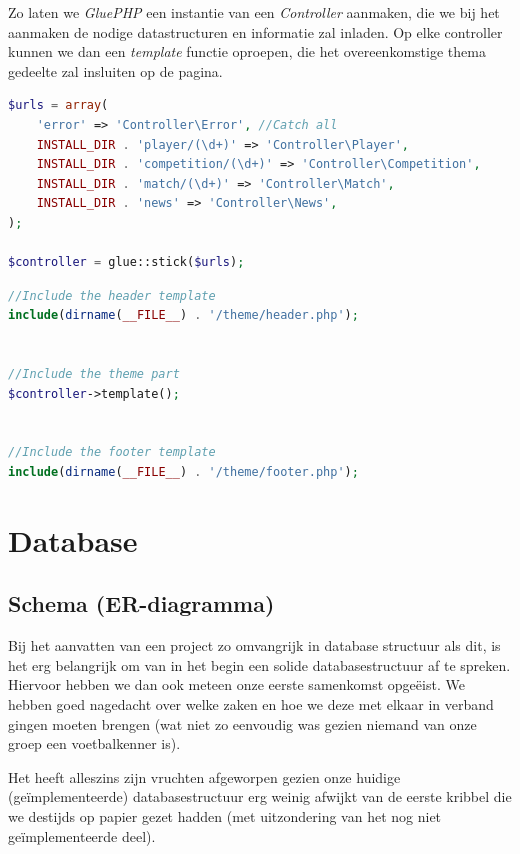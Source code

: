 \documentclass[11pt]{article}
\begin{document}
Zo laten we \emph{GluePHP} een instantie van een \emph{Controller} aanmaken, die we bij het aanmaken de nodige datastructuren en informatie zal inladen. Op elke controller kunnen we dan een \emph{template} functie oproepen, die het overeenkomstige thema gedeelte zal insluiten op de pagina.


\begin{framed}
\begin{lstlisting}[language=php]
$urls = array(
	'error' => 'Controller\Error', //Catch all
	INSTALL_DIR . 'player/(\d+)' => 'Controller\Player',
	INSTALL_DIR . 'competition/(\d+)' => 'Controller\Competition',
	INSTALL_DIR . 'match/(\d+)' => 'Controller\Match',
	INSTALL_DIR . 'news' => 'Controller\News',
);

$controller = glue::stick($urls);
\end{lstlisting}
\end{framed}


\begin{framed}
\begin{lstlisting}[language=php]
//Include the header template
include(dirname(__FILE__) . '/theme/header.php');


//Include the theme part
$controller->template();


//Include the footer template
include(dirname(__FILE__) . '/theme/footer.php');
\end{lstlisting}
\end{framed}



\section{Database}

\subsection{Schema (ER-diagramma)}

Bij het aanvatten van een project zo omvangrijk in database structuur als dit, is het erg belangrijk om van in het begin een solide databasestructuur af te spreken.
Hiervoor hebben we dan ook meteen onze eerste samenkomst opge{\"e}ist.  We hebben goed nagedacht over welke zaken en hoe we deze met elkaar in verband gingen moeten brengen (wat niet zo eenvoudig was gezien niemand van onze groep een voetbalkenner is).

Het heeft alleszins zijn vruchten afgeworpen gezien onze huidige (ge{\"i}mplementeerde) databasestructuur erg weinig afwijkt van de eerste kribbel die we destijds op papier gezet hadden (met uitzondering van het nog niet ge{\"i}mplementeerde deel).
\end{document}
